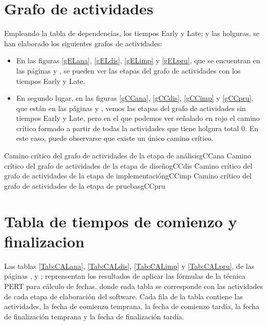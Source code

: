 \documentclass[11pt,a4paper,spanish,twoside]{report}
\begin{document}
\section{Grafo de actividades}
Empleando la tabla de dependencias, los tiempos Early y Late; y las holguras,
se han elaborado los siguientes grafos de actividades:

\begin{itemize}
\item En las figuras \ref{gELana}, \ref{gELdis}, \ref{gELimp} y \ref{gELpru},
  que se encuentran en las páginas \pageref{gELana} y \pageref{gELpru}, se
  pueden ver las etapas del grafo de actividades con los tiempos Early y
  Late.
\item En segundo lugar, en las figuras \ref{gCCana}, \ref{gCCdis},
  \ref{gCCimp} y \ref{gCCpru}, que están en las páginas \pageref{gELana} y
  \pageref{gELpru}, vemos las etapas del grafo de actividades sin tiempos
  Early y Late, pero en el que podemos ver señalado en rojo el camino crítico
  formado a partir de todas la actividades que tiene holgura total 0. En este
  caso, puede observarse que existe un único camino crítico.
\end{itemize}

{Camino crítico del grafo de actividades de la etapa de análisis}{gCCana}
{Camino crítico del grafo de actividades de la etapa de diseño}{gCCdis}
{Camino crítico del grafo de actividades de la etapa de implementación}{gCCimp}
{Camino crítico del grafo de actividades de la etapa de pruebas}{gCCpru}

\section{Tabla de tiempos de comienzo y finalizacion}
Las tablas \ref{Tab:CALana}, \ref{Tab:CALdis}, \ref{Tab:CALimp} y
\ref{Tab:CALpru}, de las páginas \pageref{Tab:CALana}, \pageref{Tab:CALdis} y
\pageref{Tab:CALpru}; reprensentan los resultados de aplicar las fórmulas de la
técnica PERT para cálculo de fechas, donde cada tabla se corresponde con las
actividades de cada etapa de elaboración del software. Cada fila de la
tabla contiene las actividades, la fecha de comienzo temprana, la fecha
de comienzo tardía, la fecha de finalización temprana y la fecha de
finalización tardía.
\end{document}
